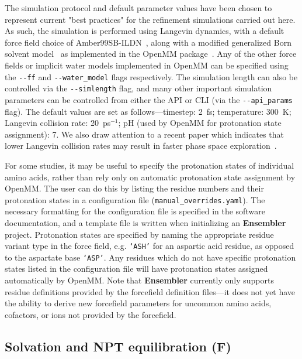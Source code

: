 \documentclass[aps,prl,preprint,nofootinbib,superscriptaddress,linenumbers]{revtex4-1}
\begin{document}
The simulation protocol and default parameter values have been chosen to represent current "best practices" for the refinement simulations carried out here.
As such, the simulation is performed using Langevin dynamics, with a default force field choice of Amber99SB-ILDN~\cite{amber99sb-ildn}, along with a modified generalized Born solvent model~\cite{gbsa-obc1} as implemented in the OpenMM package~\cite{eastman:jctc:2012:openmm}.
Any of the other force fields or implicit water models implemented in OpenMM can be specified using the {\tt -{}-ff} and {\tt -{}-water\_model} flags respectively.
The simulation length can also be controlled via the {\tt -{}-simlength} flag, and many other important simulation parameters can be controlled from either the API or CLI (via the {\tt -{}-api\_params} flag).
The default values are set as follows---timestep: 2~fs; temperature: 300~K; Langevin collision rate: 20~ps$^{-1}$; pH (used by OpenMM for protonation state assignment): 7.
We also draw attention to a recent paper which indicates that lower Langevin collision rates may result in faster phase space exploration~\cite{basconi:jctc:2013:collision-rates}.

For some studies, it may be useful to specify the protonation states of individual amino acids, rather than rely only on automatic protonation state assignment by OpenMM.
The user can do this by listing the residue numbers and their protonation states in a configuration file ({\tt manual\_overrides.yaml}).
The necessary formatting for the configuration file is specified in the software documentation, and a template file is written when initializing an {\bf Ensembler} project.
Protonation states are specified by naming the appropriate residue variant type in the force field, e.g. {\tt `ASH'} for an aspartic acid residue, as opposed to the aspartate base {\tt `ASP'}.
Any residues which do not have specific protonation states listed in the configuration file will have protonation states assigned automatically by OpenMM.
Note that {\bf Ensembler} currently only supports residue definitions provided by the forcefield definition files---it does not yet have the ability to derive new forcefield parameters for uncommon amino acids, cofactors, or ions not provided by the forcefield.

\subsection{Solvation and NPT equilibration (F)}
\end{document}
